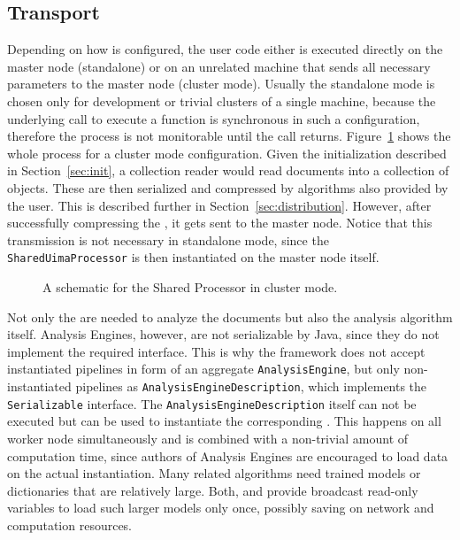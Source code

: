 \subsection{Transport}
Depending on how \spark{} is configured, the user code either is executed directly on the master node (standalone) or on an unrelated machine that sends all necessary parameters to the master node (cluster mode). Usually the standalone mode is chosen only for development or trivial clusters of a single machine, because the underlying call to execute a function is synchronous in such a configuration, therefore the process is not monitorable until the call returns. Figure~\ref{fig:sup_schema} shows the whole process for a cluster mode configuration. Given the initialization described in Section~\ref{sec:init}, a collection reader would read documents into a collection of \cas{} objects. These are then serialized and compressed by algorithms also provided by the user. This is described further in Section~\ref{sec:distribution}. However, after successfully compressing the \cas{}, it gets sent to the \spark{} master node. Notice that this transmission is not necessary in standalone mode, since the \lstinline|SharedUimaProcessor| is then instantiated on the master node itself.
\begin{figure}[htb]
	\centering
	\resizebox{\linewidth}{!}{\small}
	\caption[A schematic for the Shared UIMA Processor in cluster mode.]{A schematic for the Shared \uima{} Processor in cluster mode.}
	\label{fig:sup_schema}
\end{figure}
Not only the \cas{} are needed to analyze the documents but also the analysis algorithm itself. Analysis Engines, however, are not serializable by Java, since they do not implement the required interface. This is why the framework does not accept instantiated pipelines in form of an aggregate \lstinline|AnalysisEngine|, but only non-instantiated pipelines as \lstinline|AnalysisEngineDescription|, which implements the \lstinline|Serializable| interface. The \lstinline|AnalysisEngineDescription| itself can not be executed but can be used to instantiate the corresponding \anen{}. This happens on all worker node simultaneously and is combined with a non-trivial amount of computation time, since authors of Analysis Engines are encouraged to load data on the actual instantiation. Many \nlp{} related algorithms need trained models or dictionaries that are relatively large. Both, \uima{} and \spark{} provide broadcast read-only variables to load such larger models only once, possibly saving on network and computation resources.

